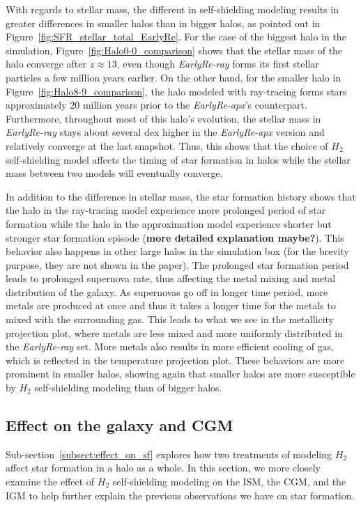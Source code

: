 \documentclass[linenumbers, twocolumn]{aastex631}
\begin{document}
With regards to stellar mass, the different in self-shielding modeling results in greater differences in smaller halos than in bigger halos, as pointed out in Figure~\ref{fig:SFR_stellar_total_EarlyRe}. For the case of the biggest halo in the simulation, Figure~\ref{fig:Halo0-0_comparison} shows that the stellar mass of the halo converge after $z \approx 13$, even though \textit{EarlyRe-ray} forms its first stellar particles a few million years earlier. On the other hand, for the smaller halo in Figure~\ref{fig:Halo8-9_comparison}, the halo modeled with ray-tracing forms stars approximately 20 million years prior to the \textit{EarlyRe-apx}'s counterpart. Furthermore, throughout most of this halo's evolution, the stellar mass in \textit{EarlyRe-ray} stays about several dex higher in the \textit{EarlyRe-apx} version and relatively converge at the last snapshot. Thus, this shows that the choice of $H_{2}$ self-shielding model affects the timing of star formation in halos while the stellar mass between two models will eventually converge.  

In addition to the difference in stellar mass, the star formation history shows that the halo in the ray-tracing model experience more prolonged period of star formation while the halo in the approximation model experience shorter but stronger star formation episode (\textbf{more detailed explanation maybe?}). This behavior also happens in other large halos in the simulation box (for the brevity purpose, they are not shown in the paper). The prolonged star formation period leads to prolonged supernova rate, thus affecting the metal mixing and metal distribution of the galaxy. As supernovas go off in longer time period, more metals are produced at once and thus it takes a longer time for the metals to mixed with the surrounding gas. This leads to what we see in the metallicity projection plot, where metals are less mixed and more uniformly distributed in the \textit{EarlyRe-ray} set. More metals also results in more efficient cooling of gas, which is reflected in the temperature projection plot. These behaviors are more prominent in smaller halos, showing again that smaller halos are more susceptible by $H_{2}$ self-shielding modeling than of bigger halos. 

\subsection{Effect on the galaxy and CGM}
\label{subsect:ISM_CGM}

Sub-section~\ref{subsect:effect_on_sf} explores how two treatments of modeling $H_{2}$ affect star formation in a halo as a whole. In this section, we more closely examine the effect of $H_{2}$ self-shielding modeling on the ISM, the CGM, and the IGM to help further explain the previous observations we have on star formation. 
\end{document}
